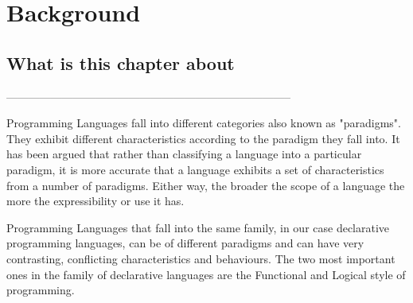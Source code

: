 \documentclass[thesis-solanki.tex]{subfiles}
\begin{document}
\chapter{Background}\label{chap:background}

\section{What is this chapter about}

-----------------------------------------------------------------------------

Programming Languages fall into different categories also known as
"paradigms". They exhibit different characteristics according to the paradigm they
fall into.
It has been argued \cite{Krishnamurthi:2008:TPL:1480828.1480846} that
rather than classifying a language into a particular paradigm, it is
more accurate that a language exhibits a set of characteristics from a
number of paradigms.
Either way, the broader the scope of a language the more the
expressibility or use it has.

Programming Languages that fall into the same family, in our case
declarative programming languages, can be of different paradigms and can
have very contrasting, conflicting characteristics and behaviours.
The two most important ones in the family of declarative languages are
the Functional and Logical style of programming.
\end{document}
